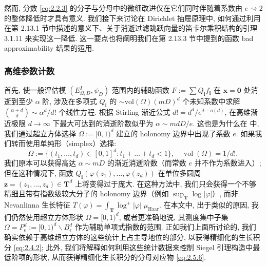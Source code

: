 然而, 分数 \eqref{eq:2.2.3} 的分子与分母中的微细改进仅在它们同时伴随着系数由 \(e \rightsquigarrow 2\) 的整体降低时才具有意义. 我们接下来讨论在 Dirichlet 抽屉原理中, 如何通过利用在第 2.13.1 节中描述的意义下、关于消逝过滤跳跃向量的笛卡尔乘积结构的引理 3.1.11 来实现这一降低. 这一要点也将阐明我们在第 2.13.3 节中提到的函数 bad approximability 结果的运用.

\subsubsection{高维参数计数}\label{sec:2.13.6}

首先, 使一般评估模 \((E_{\Omega,D}^I, \psi_D)\) 范围内的辅助函数 \(F := \sum Q_{\mathbf{i}} f_{\mathbf{i}}\) 在 \(\mathbf{x} = \mathbf{0}\) 处消逝到至少 \(\alpha\) 阶, 涉及在多项式 \(Q_{\mathbf{i}}\) 的 \(\sim \text{vol}(\Omega)(mD)^d\) 个未知系数中求解 \(\binom{\alpha+d}{d} \sim \alpha^d/d!\) 个线性方程. 根据 Stirling 渐近公式 \(d! = d^d/e^{d-o(d)}\), 在高维渐近极限 \(d \to \infty\) 下最大可达到的消逝阶数似乎为 \(\alpha \sim mdD/e\). 这也是为什么在 \cite[§ 2]{CDT21} 中, 我们通过超立方体选择 \(\Omega := [0,1)^d\) 建立的 holonomy 边界中出现了系数 \(e\). 如果我们转而使用单纯形（simplex）选择:
\[ \Omega := \{(t_1, \dots, t_d) \in [0, 1]^d : t_1 + \dots + t_d < 1\}, \quad \operatorname{vol}(\Omega) = 1/d!, \]
我们原本可以获得高达 \(\alpha \sim mD\) 的渐近消逝阶数（而常数 \(e\) 并不作为系数进入）; 但在这种情况下, 函数 \(Q_{\mathbf{i}}(\varphi(z_1),\dots,\varphi(z_d))\) 在单位多圆周 \(\mathbf{z}=(z_1,\dots,z_d)\in\mathbf{T}^d\) 上将变得过于庞大. 在这种方法中, 我们只会获得一个不够精细且带有指数级较大分子的 holonomy 边界（例如 \(\sup_{\mathbf{T}}\log\lvert\varphi\rvert\)）, 而非 Nevanlinna 生长特征 \(T(\varphi)=\int_{\mathbf{T}}\log^+\lvert\varphi\rvert\;\mu_{\mathrm{Haar}}\). 在本文中, 出于类似的原因, 我们仍然使用超立方体形状 \(\Omega=[0,1)^d\), 或者更准确地说, 其测度集中子集 \(\Omega=P_\epsilon^d:=[0,1)^d\smallsetminus B_\epsilon^d\) 作为辅助单项式指数的范围. 正如我们上面所讨论的, 我们确实依赖于高维超立方体的这些统计上占主导地位的部分, 以获得精细化的生长积分 \eqref{eq:2.4.2}; 此外, 我们将解释如何利用这些统计数据来控制 Siegel 引理构造中最低阶项的形状, 从而获得精细化生长积分的分母对应物 \eqref{eq:2.5.6}.

